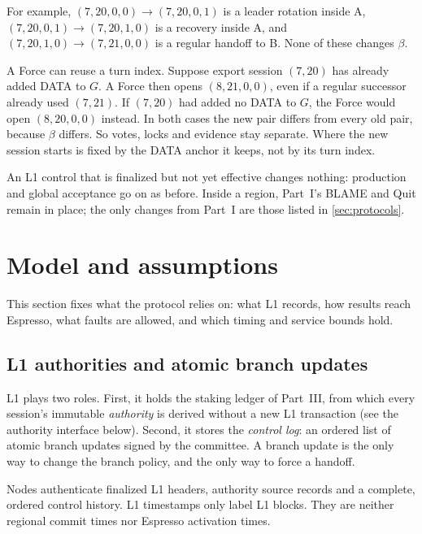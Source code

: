 \documentclass[11pt,a4paper]{article}
\newcounter{protocol}
\begin{document}
For example, $(7,20,0,0)\to(7,20,0,1)$ is a leader rotation inside A,
$(7,20,0,1)\to(7,20,1,0)$ is a recovery inside A, and
$(7,20,1,0)\to(7,21,0,0)$ is a regular handoff to B. None of these
changes $\beta$.

A Force can reuse a turn index. Suppose export session $(7,20)$ has
already added DATA to $G$. A Force then opens $(8,21,0,0)$, even if
a regular successor already used $(7,21)$. If $(7,20)$ had added no
DATA to $G$, the Force would open $(8,20,0,0)$ instead. In both cases
the new pair differs from every old pair, because $\beta$ differs. So
votes, locks and evidence stay separate. Where the new session starts is
fixed by the DATA anchor it keeps, not by its turn index.

An L1 control that is finalized but not yet effective changes nothing:
production and global acceptance go on as before. Inside a region,
Part~I's BLAME and Quit remain in place; the only changes from Part~I
are those listed in \cref{sec:protocols}.


\section{Model and assumptions}
\label{sec:model}
This section fixes what the protocol relies on: what L1 records, how
results reach Espresso, what faults are allowed, and which timing and
service bounds hold.

\subsection{L1 authorities and atomic branch updates}
\label{sec:l1}
\label{sec:runtime-controls}
L1 plays two roles. First, it holds the staking ledger of Part~III,
from which every session's immutable \emph{authority} is derived without
a new L1 transaction (see the authority interface below). Second, it stores
the \emph{control log}: an ordered list of atomic branch updates signed
by the committee. A branch update is the only way to change the branch
policy, and the only way to force a handoff.

Nodes authenticate finalized L1 headers, authority source records and a
complete, ordered control history. L1 timestamps only label L1 blocks. They are
neither regional commit times nor Espresso activation times.
\end{document}
